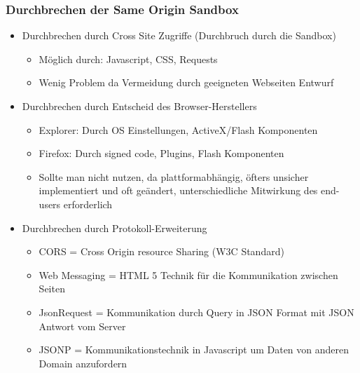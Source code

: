 \documentclass{article} %
\begin{document}
	\subsubsection{Durchbrechen der Same Origin Sandbox}
	\begin{itemize}
		\item Durchbrechen durch Cross Site Zugriffe (Durchbruch durch die Sandbox)
		\begin{itemize} 
			\item Möglich durch: Javascript, CSS, Requests
			\item Wenig Problem da Vermeidung durch geeigneten Webseiten Entwurf
		\end{itemize}
		\item Durchbrechen durch Entscheid des Browser-Herstellers
		\begin{itemize}
			\item Explorer: Durch OS Einstellungen, ActiveX/Flash Komponenten
			\item Firefox: Durch signed code, Plugins, Flash Komponenten
			\item Sollte man nicht nutzen, da plattformabhängig, öfters unsicher implementiert und
			oft geändert, unterschiedliche Mitwirkung des end-users erforderlich
		\end{itemize}
		\item Durchbrechen durch Protokoll-Erweiterung
		\begin{itemize}
			\item CORS = Cross Origin resource Sharing (W3C Standard)
			\item Web Messaging = HTML 5 Technik für die Kommunikation zwischen Seiten
			\item JsonRequest = Kommunikation durch Query in JSON Format mit JSON Antwort vom Server
			\item JSONP = Kommunikationstechnik in Javascript um Daten von anderen Domain anzufordern
		\end{itemize}
	\end{itemize}
\end{document}
